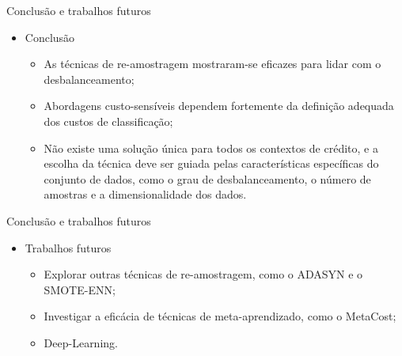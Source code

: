 \begin{frame}{Conclusão e trabalhos futuros}
  \begin{itemize}
    \item[$\blacktriangleright$] Conclusão
      \begin{itemize}
        \item As técnicas de re-amostragem mostraram-se eficazes para lidar com o desbalanceamento;
        \item Abordagens custo-sensíveis dependem fortemente da definição adequada dos custos de classificação;
        \item Não existe uma solução única para todos os contextos de crédito, e a escolha da técnica deve ser guiada pelas características específicas do conjunto de dados, como o grau de desbalanceamento, o número de amostras e a dimensionalidade dos dados.
      \end{itemize}
  \end{itemize}
\end{frame}

\begin{frame}{Conclusão e trabalhos futuros}
  \begin{itemize}
    \item[$\blacktriangleright$] Trabalhos futuros
      \begin{itemize}
        \item Explorar outras técnicas de re-amostragem, como o ADASYN e o SMOTE-ENN;
        \item Investigar a eficácia de técnicas de meta-aprendizado, como o MetaCost;
        \item Deep-Learning.
      \end{itemize}
  \end{itemize}
\end{frame}

